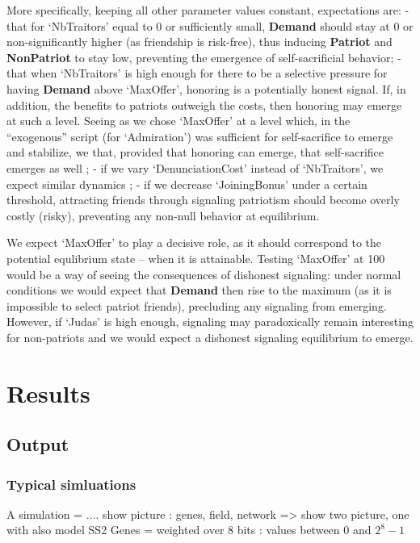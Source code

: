 \documentclass[a4paper,12pt]{report}
\begin{document}
More specifically, keeping all other parameter values constant, expectations are:
- that for ‘NbTraitors’ equal to 0 or sufficiently small, \textbf{Demand} should stay at 0 or non-significantly higher (as friendship is risk-free), thus inducing \textbf{Patriot} and \textbf{NonPatriot} to stay low, preventing the emergence of self-sacrificial behavior;
- that when ‘NbTraitors’ is high enough for there to be a selective pressure for having \textbf{Demand} above ‘MaxOffer’, honoring is a potentially honest signal. If, in addition, the benefits to patriots outweigh the costs, then honoring may emerge at such a level. Seeing as we chose ‘MaxOffer’ at a level which, in the “exogenous” script (for ‘Admiration’) was sufficient for self-sacrifice to emerge and stabilize, we that, provided that honoring can emerge, that self-sacrifice emerges as well ;
- if we vary ‘DenunciationCost’ instead of ‘NbTraitors’, we expect similar dynamics ;
- if we decrease ‘JoiningBonus’ under a certain threshold, attracting friends through signaling patriotism should become overly costly (risky), preventing any non-null behavior at equilibrium.

We expect ‘MaxOffer’ to play a decisive role, as it should correspond to the potential equlibrium state – when it is attainable. Testing ‘MaxOffer’ at 100 would be a way of seeing the consequences of dishonest signaling: under normal conditions we would expect that \textbf{Demand} then rise to the maximum (as it is impossible to select patriot friends), precluding any signaling from emerging. However, if ‘Judas’ is high enough, signaling may paradoxically remain interesting for non-patriots and we would expect a dishonest signaling equilibrium to emerge.


\chapter{Results}
\section{Output}
\subsection{Typical simluations}

A simulation = .... show picture : genes, field, network
=> show two picture, one with also model SS2
Genes = weighted over 8 bits : values between $0$ and $2^8 - 1$
\end{document}
